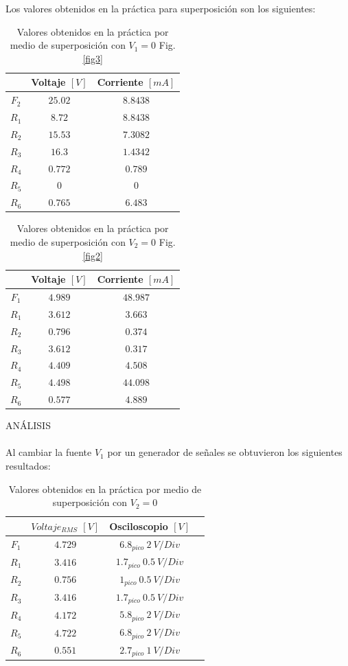 \documentclass[twocolumn]{IEEEtran}
\begin{document}
Los valores obtenidos en la práctica para superposición son los siguientes:
\begin{table}[H]
	\centering
\begin{tabular}[c]{|c||c|c|} \hline
 & Voltaje $[V]$ & Corriente $[mA]$ \\ \hline
$F_2$ & $25.02$ & $8.8438$ \\ \hline
$R_1$ & $8.72$ & $8.8438$ \\ \hline
$R_2$ & $15.53$ & $7.3082$ \\ \hline
$R_3$ & $16.3$ & $1.4342$ \\ \hline
$R_4$ & $0.772$ & $0.789$\\ \hline
$R_5$ & $0$ & $0$ \\ \hline
$R_6$ & $0.765$ & $6.483$ \\ \hline
\end{tabular}
	\caption{Valores obtenidos en la práctica por medio de superposición con $V_1 = 0$ Fig. \ref{fig3}}
	\label{tab3}
\end{table}
\begin{table}[H]
	\centering
\begin{tabular}[c]{|c||c|c|} \hline
 & Voltaje $[V]$ & Corriente $[mA]$ \\ \hline
$F_1$ & $4.989$ & $48.987$ \\ \hline
$R_1$ & $3.612$ & $3.663$ \\ \hline
$R_2$ & $0.796$ & $0.374$ \\ \hline
$R_3$ & $3.612$ & $0.317$ \\ \hline
$R_4$ & $4.409$ & $4.508$\\ \hline
$R_5$ & $4.498$ & $44.098$ \\ \hline
$R_6$ & $0.577$ & $4.889$ \\ \hline
\end{tabular}
	\caption{Valores obtenidos en la práctica por medio de superposición con $V_2 = 0$ Fig. \ref{fig2}}
	\label{tab4}
\end{table}
\noindent
ANÁLISIS
\\\\
Al cambiar la fuente $V_1$ por un generador de señales se obtuvieron los siguientes resultados:
\begin{table}[H]
	\centering
\begin{tabular}[c]{|c||c|c|c|} \hline
 & $Voltaje_{RMS}$ $[V]$ & Osciloscopio $[V]$\\ \hline
$F_1$ & $4.729$ & $6.8_{pico} \ 2\ V/Div$ \\ \hline
$R_1$ & $3.416$ & $1.7_{pico} \ 0.5\ V/Div$ \\ \hline
$R_2$ & $0.756$ & $1_{pico} \ 0.5\ V/Div$ \\ \hline
$R_3$ & $3.416$ & $1.7_{pico} \ 0.5\ V/Div$ \\ \hline
$R_4$ & $4.172$ & $5.8_{pico} \ 2\ V/Div$ \\ \hline
$R_5$ & $4.722$ & $6.8_{pico} \ 2\ V/Div$ \\ \hline
$R_6$ & $0.551$ & $2.7_{pico} \ 1\ V/Div$ \\ \hline
\end{tabular}
	\caption{Valores obtenidos en la práctica por medio de superposición con $V_2 = 0$}
	\label{tab6}
\end{table}
\end{document}
